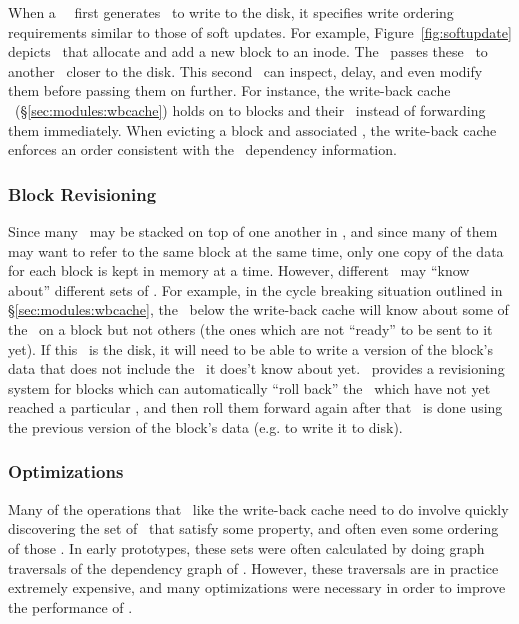 When a \Kudos\ \module\ first generates \chdescs\ to write to the disk, it
specifies write ordering requirements similar to those of soft updates. For
example, Figure~\ref{fig:softupdate} depicts \chdescs\ that allocate and add a
new block to an inode. The \module\ passes these \chdescs\ to another \module\
closer to the disk. This second \module\ can inspect, delay, and even modify
them before passing them on further. For instance, the write-back cache \module\
(\S\ref{sec:modules:wbcache}) holds on to blocks and their \chdescs\ instead of
forwarding them immediately. When evicting a block and associated \chdescs, the
write-back cache enforces an order consistent with the \chdesc\ dependency
information.

\subsubsection{Block Revisioning}

Since many \modules\ may be stacked on top of one another in \Kudos, and since
many of them may want to refer to the same block at the same time, only one copy
of the data for each block is kept in memory at a time. However, different
\modules\ may ``know about'' different sets of \chdescs. For example, in the
cycle breaking situation outlined in \S\ref{sec:modules:wbcache}, the \module\
below the write-back cache will know about some of the \chdescs\ on a block but
not others (the ones which are not ``ready'' to be sent to it yet). If this
\module\ is the disk, it will need to be able to write a version of the block's
data that does not include the \chdescs\ it does't know about yet. \Kudos\
provides a revisioning system for blocks which can automatically ``roll back''
the \chdescs\ which have not yet reached a particular \module, and then roll
them forward again after that \module\ is done using the previous version of the
block's data (e.g. to write it to disk).

\subsubsection {Optimizations}
Many of the operations that \modules\ like the write-back cache need to do
involve quickly discovering the set of \chdescs\ that satisfy some property,
and often even some ordering of those \chdescs. In early prototypes, these sets
were often calculated by doing graph traversals of the dependency graph of
\chdescs. However, these traversals are in practice extremely expensive, and
many optimizations were necessary in order to improve the performance of
\Kudos.

